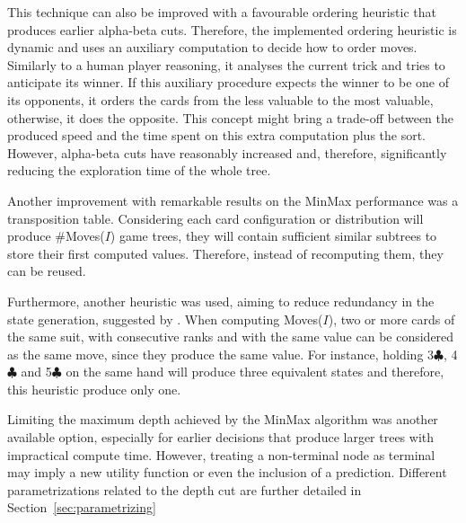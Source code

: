 This technique can also be improved with a favourable ordering heuristic that produces earlier alpha-beta cuts.
Therefore, the implemented ordering heuristic is dynamic and uses an auxiliary computation to decide how to order moves.
Similarly to a human player reasoning, it analyses the current trick and tries to anticipate its winner.
If this auxiliary procedure expects the winner to be one of its opponents, it orders the cards from the less valuable to the most valuable, otherwise, it does the opposite.
This concept might bring a trade-off between the produced speed and the time spent on this extra computation plus the sort.
However, alpha-beta cuts have reasonably increased and, therefore, significantly reducing the exploration time of the whole tree.

Another improvement with remarkable results on the MinMax performance was a transposition table.
Considering each card configuration or distribution will produce \#Moves($I$) game trees, they will contain sufficient similar subtrees to store their first computed values.
Therefore, instead of recomputing them, they can be reused.

Furthermore, another heuristic was used, aiming to reduce redundancy in the state generation, suggested by \citet{Buro}.
When computing Moves($I$), two or more cards of the same suit, with consecutive ranks and with the same value can be considered as the same move, since they produce the same value.
For instance, holding 3$\clubsuit$, 4$\clubsuit$ and 5$\clubsuit$ on the same hand will produce three equivalent states and therefore, this heuristic produce only one.

Limiting the maximum depth achieved by the MinMax algorithm was another available option, especially for earlier decisions that produce larger trees with impractical compute time.
However, treating a non-terminal node as terminal may imply a new utility function or even the inclusion of a prediction.
Different parametrizations related to the depth cut are further detailed in Section~\ref{sec:parametrizing}












